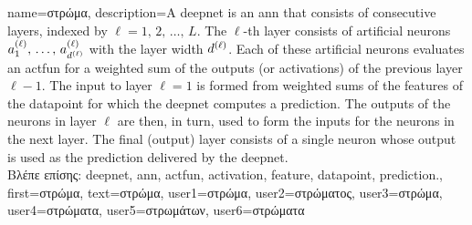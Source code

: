{name={\foreignlanguage{greek}{στρώμα}},
	description={A \gls{deepnet} is an \gls{ann} that consists of consecutive layers, indexed by $\ell=1,\,2,\,\ldots,\,L$. 
		The $\ell$-th layer consists of artificial neurons $a^{(\ell)}_{1},\,\ldots,\,a^{(\ell)}_{d^{(\ell)}}$ with 
		the layer width $d^{(\ell)}$. Each of these artificial neurons evaluates an \gls{actfun} for 
		a weighted sum of the outputs (or \gls{activation}s) of the previous layer $\ell-1$. The input to layer $\ell=1$ 
	    	is formed from weighted sums of the \gls{feature}s of the \gls{datapoint} for which the \gls{deepnet} 
	    	computes a \gls{prediction}. The outputs of the neurons in layer $\ell$ are then, in turn, used to form 
	    	the inputs for the neurons in the next layer. The final (output) layer consists of a single neuron whose 
		output is used as the \gls{prediction} delivered by the \gls{deepnet}. \\
		\foreignlanguage{greek}{Βλέπε επίσης:} \gls{deepnet}, \gls{ann}, \gls{actfun}, \gls{activation}, \gls{feature}, \gls{datapoint}, \gls{prediction}.}, 
	first={\foreignlanguage{greek}{στρώμα}},
	text={\foreignlanguage{greek}{στρώμα}},
	user1={\foreignlanguage{greek}{στρώμα}}, %
	user2={\foreignlanguage{greek}{στρώματος}}, %
	user3={\foreignlanguage{greek}{στρώμα}}, %
	user4={\foreignlanguage{greek}{στρώματα}}, %
	user5={\foreignlanguage{greek}{στρωμάτων}}, %
	user6={\foreignlanguage{greek}{στρώματα}} %
}


